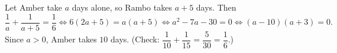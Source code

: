 Let Amber take $a$ days alone, so Rambo takes $a+5$ days. Then
\[\dfrac1a+\dfrac1{a+5}=\dfrac16\iff6(2a+5)=a(a+5)\iff a^2-7a-30=0\iff(a-10)(a+3)=0.\]
Since $a>0$, Amber takes $\boxed{10}$ days. (Check: $\dfrac1{10}+\dfrac1{15}=\dfrac5{30}=\dfrac16$.)
